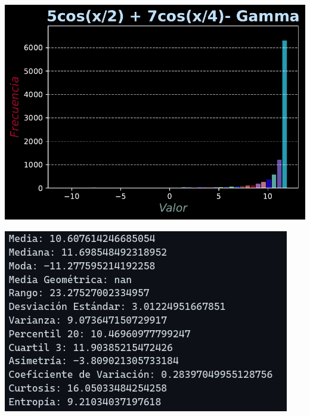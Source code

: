 \documentclass[11pt]{article} %
\begin{document}
	\begin{multicols}{2}
		\begin{minipage}{\linewidth}
			\centering
			\includegraphics[width=1\linewidth]{../transformaciones/per_gamma2.pdf}
			\label{fig:perGammaHist}
		\end{minipage}
		\vfill\columnbreak
		\begin{minipage}{\linewidth}
			\centering
			\includegraphics[width=1\linewidth]{../transformaciones/per_gamma3.png}
			\label{perGammaMet}
		\end{minipage}
	\end{multicols}
	
\end{document}
